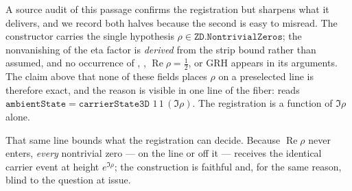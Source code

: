 \documentclass[11pt]{article}
\theoremstyle{definition}
\renewcommand{\Re}{\operatorname{Re}}
\begin{document}
A source audit of this passage confirms the registration but sharpens what it
delivers, and we record both halves because the second is easy to misread.
The constructor
 carries the single
hypothesis \(\rho\in\texttt{ZD.NontrivialZeros}\); the nonvanishing of the eta
factor is \emph{derived} from the strip bound rather than assumed, and no
occurrence of , ,
\(\Re\rho=\tfrac12\), or GRH appears in its arguments. The claim above that
none of these fields places \(\rho\) on a preselected line is therefore exact,
and the reason is visible in one line of the fiber:
 reads
\(\texttt{ambientState}=\texttt{carrierState3D }1\,1\,(\Im\rho)\). The
registration is a function of \(\Im\rho\) alone.

That same line bounds what the registration can decide. Because \(\Re\rho\)
never enters, \emph{every} nontrivial zero --- on the line or off it ---
receives the identical carrier event at height \(e^{\Im\rho}\); the
construction is faithful and, for the same reason, blind to the question at
issue.
\end{document}
